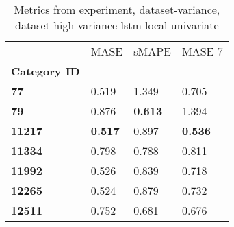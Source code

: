 \begin{table}[H]
\centering
\caption{Metrics from experiment, dataset-variance, dataset-high-variance-lstm-local-univariate}
\label{table:dataset-high-variance-lstm-local-univariate-dataset-variance}
\begin{tabular}{llll}
\toprule
{} &            MASE &           sMAPE &          MASE-7 \\
\textbf{Category ID} &                 &                 &                 \\
\midrule
\textbf{77         } &           0.519 &           1.349 &           0.705 \\
\textbf{79         } &           0.876 &  \textbf{0.613} &           1.394 \\
\textbf{11217      } &  \textbf{0.517} &           0.897 &  \textbf{0.536} \\
\textbf{11334      } &           0.798 &           0.788 &           0.811 \\
\textbf{11992      } &           0.526 &           0.839 &           0.718 \\
\textbf{12265      } &           0.524 &           0.879 &           0.732 \\
\textbf{12511      } &           0.752 &           0.681 &           0.676 \\
\bottomrule
\end{tabular}
\end{table}
